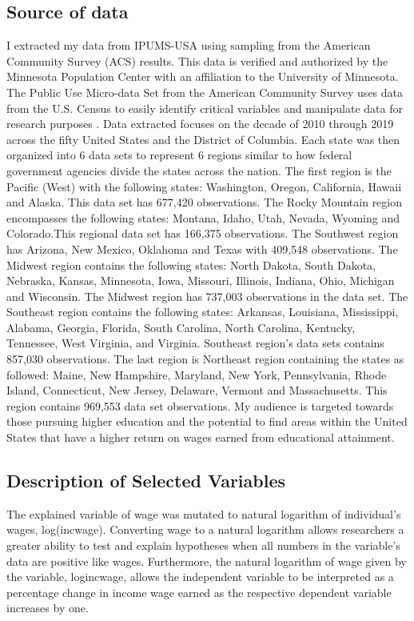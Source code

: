 \documentclass[12pt, English]{article}
\begin{document}
\subsection{Source of data}
I extracted my data from IPUMS-USA using sampling from the American Community Survey (ACS) results. This data is verified and authorized by the Minnesota Population Center with an affiliation to the University of Minnesota. The Public Use Micro-data Set from the American Community Survey uses data from the U.S. Census to easily identify critical variables and manipulate data for research purposes \citep{IPUMSUSA}. Data extracted focuses on the decade of 2010 through 2019 across the fifty United States and the District of Columbia. Each state was then organized into 6 data sets to represent 6 regions similar to how federal government agencies divide the states across the nation. The first region is the Pacific (West) with the following states: Washington, Oregon, California, Hawaii and Alaska. This data set has  677,420 observations. The Rocky Mountain region encompasses the following states: Montana, Idaho, Utah, Nevada, Wyoming and Colorado.This regional data set has 166,375 observations. The Southwest region has Arizona, New Mexico, Oklahoma and Texas with 409,548 observations. The Midwest region contains the following states: North Dakota, South Dakota, Nebraska, Kansas, Minnesota, Iowa, Missouri, Illinois, Indiana, Ohio, Michigan and Wisconsin. The Midwest region has  737,003  observations in the data set. The Southeast region contains the following states: Arkansas, Louisiana, Mississippi, Alabama, Georgia, Florida, South Carolina, North Carolina, Kentucky, Tennessee, West Virginia, and Virginia. Southeast region's data sets contains 857,030  observations. The last region is Northeast region containing the states as followed: Maine, New Hampshire, Maryland, New York, Pennsylvania, Rhode Island, Connecticut, New Jersey, Delaware, Vermont and Massachusetts. This region contains 969,553 data set observations. My audience is targeted towards those pursuing higher education and the potential to find areas within the United States that have a higher return on wages earned from educational attainment.  

\subsection{Description of Selected Variables}

The explained variable of wage was mutated to natural logarithm of individual’s wages, log(incwage). Converting wage to a natural logarithm allows researchers a greater ability to test and explain hypotheses when all numbers in the variable's data are positive like wages. Furthermore, the natural logarithm of wage given by the variable, logincwage, allows the independent variable to be interpreted as a percentage change in income wage earned as the respective dependent variable increases by one. 
\end{document}
